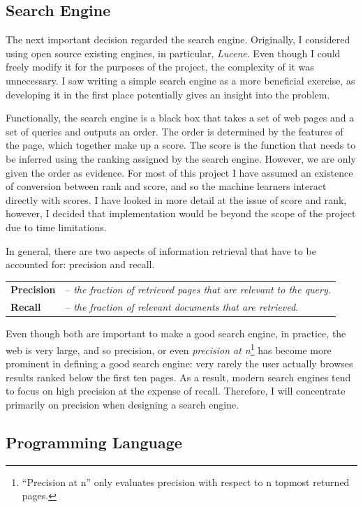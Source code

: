 \documentclass[12pt,notitlepage,twoside]{scrbook}
\begin{document}
\subsection{Search Engine}
\label{prep:se}
The next important decision regarded the search engine.  Originally, I considered
using open source existing engines, in particular, \textit{Lucene}. Even though I could
freely modify it for the purposes of the project, the complexity of it was
unnecessary. I saw writing a simple search engine as a more beneficial
exercise, as developing it in the first place potentially gives an insight into
the problem.

Functionally, the search engine is a black box that takes a set of web pages and a set of
queries and outputs an order. The order is determined by the features of the page, which
together make up a score. The score is the function that needs to be inferred using the
ranking assigned by the search engine. However, we are only given the order as evidence.
For most of this project I have assumed an existence of conversion between rank and score,
and so the machine learners interact directly with scores. I have looked in more detail at
the issue of score and rank, however, I decided that implementation would be beyond the
scope of the project due to time limitations.

In general, there are two aspects of information retrieval that have to be accounted for:
precision and recall.  

\begin{tabular}{l l}
	\textbf{Precision} & -- \textit{the fraction of retrieved pages that are
relevant to the query.}  \\
\textbf{Recall} & -- \textit{the fraction of relevant documents that are
retrieved.} \\ 
\end{tabular}

Even though both are important to make a good search engine, in practice, the
web is very large, and so precision, or even \textit{precision at n}\footnote{``Precision
at n'' only evaluates precision with respect to n topmost returned pages.} has become more
prominent in defining a good search engine: very rarely the user actually browses results
ranked below the first ten pages. As a result, modern search engines tend
to focus on high precision at the expense of recall\cite{GOOGLE}. Therefore, I will
concentrate primarily on precision when designing a search engine.


\subsection{Programming Language}
\end{document}
